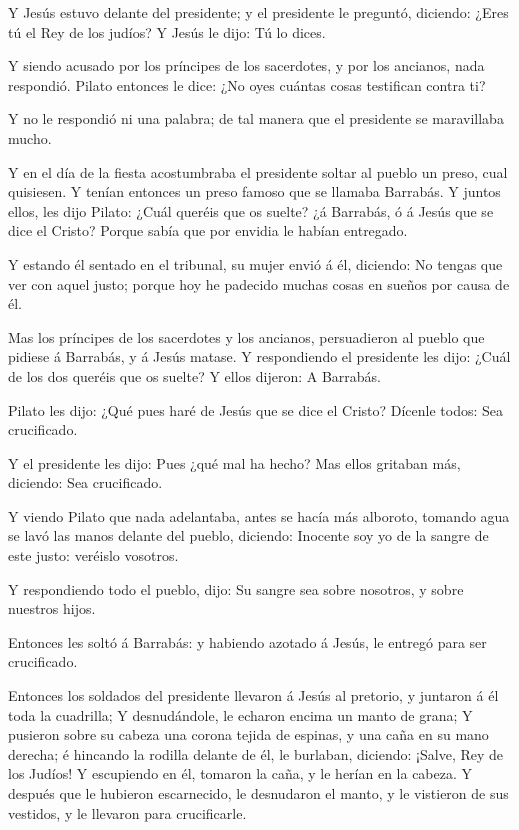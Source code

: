  Y Jesús estuvo delante del presidente; y el presidente le
preguntó, diciendo: ¿Eres tú el Rey de los judíos? Y Jesús le dijo: Tú
lo dices.

 Y siendo acusado por los príncipes de los sacerdotes, y
por los ancianos, nada respondió.  Pilato entonces le dice:
¿No oyes cuántas cosas testifican contra ti?

 Y no le respondió ni una palabra; de tal manera que el
presidente se maravillaba mucho.

 Y en el día de la fiesta acostumbraba el presidente soltar
al pueblo un preso, cual quisiesen.  Y tenían entonces un
preso famoso que se llamaba Barrabás.  Y juntos ellos, les
dijo Pilato: ¿Cuál queréis que os suelte? ¿á Barrabás, ó á Jesús que se
dice el Cristo?  Porque sabía que por envidia le habían
entregado.

 Y estando él sentado en el tribunal, su mujer envió á él,
diciendo: No tengas que ver con aquel justo; porque hoy he padecido
muchas cosas en sueños por causa de él.

 Mas los príncipes de los sacerdotes y los ancianos,
persuadieron al pueblo que pidiese á Barrabás, y á Jesús matase.
 Y respondiendo el presidente les dijo: ¿Cuál de los dos
queréis que os suelte? Y ellos dijeron: A Barrabás.

 Pilato les dijo: ¿Qué pues haré de Jesús que se dice el
Cristo? Dícenle todos: Sea crucificado.

 Y el presidente les dijo: Pues ¿qué mal ha hecho? Mas
ellos gritaban más, diciendo: Sea crucificado.

 Y viendo Pilato que nada adelantaba, antes se hacía más
alboroto, tomando agua se lavó las manos delante del pueblo, diciendo:
Inocente soy yo de la sangre de este justo: veréislo vosotros.

 Y respondiendo todo el pueblo, dijo: Su sangre sea sobre
nosotros, y sobre nuestros hijos.

 Entonces les soltó á Barrabás: y habiendo azotado á Jesús,
le entregó para ser crucificado.

 Entonces los soldados del presidente llevaron á Jesús al
pretorio, y juntaron á él toda la cuadrilla;  Y
desnudándole, le echaron encima un manto de grana;  Y
pusieron sobre su cabeza una corona tejida de espinas, y una caña en su
mano derecha; é hincando la rodilla delante de él, le burlaban,
diciendo: ¡Salve, Rey de los Judíos!  Y escupiendo en él,
tomaron la caña, y le herían en la cabeza.  Y después que
le hubieron escarnecido, le desnudaron el manto, y le vistieron de sus
vestidos, y le llevaron para crucificarle.

